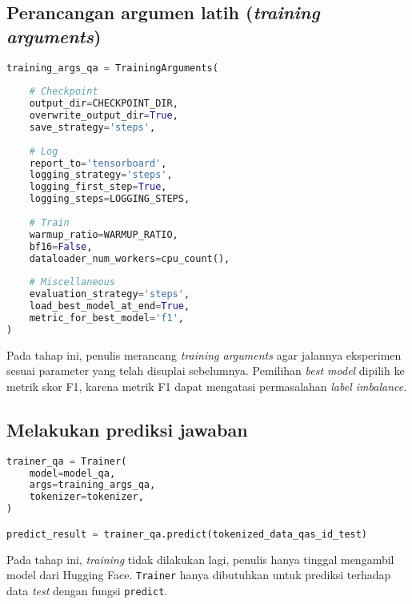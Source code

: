 \subsection{Perancangan argumen latih (\emph{training arguments})}
\begin{lstlisting}[language=Python, caption=Perancangan argumen latih (\emph{training arguments})]
training_args_qa = TrainingArguments(
        
    # Checkpoint
    output_dir=CHECKPOINT_DIR,
    overwrite_output_dir=True,
    save_strategy='steps',
    
    # Log
    report_to='tensorboard',
    logging_strategy='steps',
    logging_first_step=True,
    logging_steps=LOGGING_STEPS,
    
    # Train
    warmup_ratio=WARMUP_RATIO,
    bf16=False,
    dataloader_num_workers=cpu_count(),
    
    # Miscellaneous
    evaluation_strategy='steps',
    load_best_model_at_end=True,
    metric_for_best_model='f1',
)
\end{lstlisting}

Pada tahap ini, penulis merancang \emph{training arguments} agar jalannya eksperimen sesuai parameter yang telah disuplai sebelumnya. Pemilihan \emph{best model} dipilih ke metrik skor F1, karena metrik F1 dapat mengatasi permasalahan \emph{label imbalance}.

\subsection{Melakukan prediksi jawaban}
\begin{lstlisting}[language=Python, caption=Melakukan prediksi jawaban]
trainer_qa = Trainer(
    model=model_qa,
    args=training_args_qa,
    tokenizer=tokenizer,
)

predict_result = trainer_qa.predict(tokenized_data_qas_id_test)
\end{lstlisting}

Pada tahap ini, \emph{training} tidak dilakukan lagi, penulis hanya tinggal mengambil model dari Hugging Face. \texttt{Trainer} hanya dibutuhkan untuk prediksi terhadap data \emph{test} dengan fungsi \texttt{predict}.

